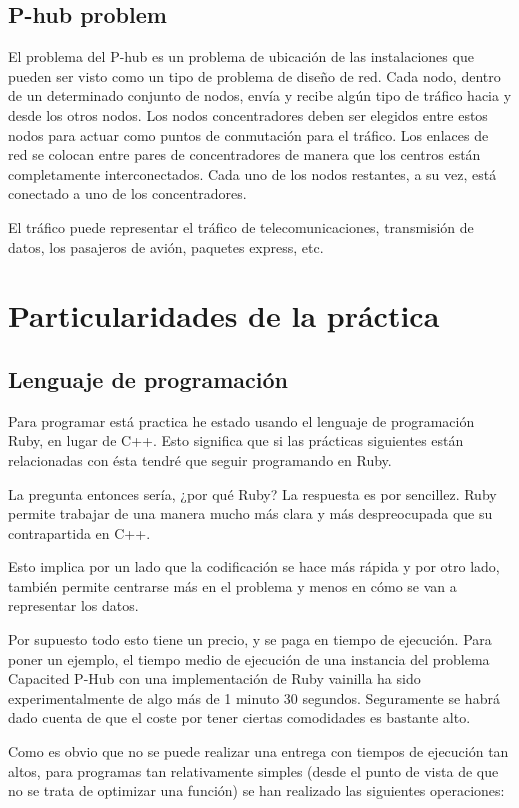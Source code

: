 \documentclass[12pt,a4paper,draft,openany]{article}
\begin{document}
\subsection{P-hub problem}
El problema del P-hub es un problema de ubicación de las instalaciones que pueden ser visto como un tipo de problema de diseño de red. Cada nodo, dentro de un determinado conjunto de nodos, envía y recibe algún tipo de tráfico hacia y desde los otros nodos. Los nodos concentradores deben ser elegidos entre estos nodos para actuar como puntos de conmutación para el tráfico. Los enlaces de red se colocan entre pares de concentradores de manera que los centros están completamente interconectados. Cada uno de los nodos restantes, a su vez, está conectado a uno de los concentradores. 

El tráfico puede representar el tráfico de telecomunicaciones, transmisión de datos, los pasajeros de avión, paquetes express, etc.

\section{Particularidades de la práctica}
\subsection{Lenguaje de programación}
Para programar está practica he estado usando el lenguaje de programación Ruby, en lugar de C++. Esto significa que si las prácticas siguientes están relacionadas con ésta tendré que seguir programando en Ruby.

La pregunta entonces sería, ¿por qué Ruby? La respuesta es por sencillez. Ruby permite trabajar de una manera mucho más clara y más despreocupada que su contrapartida en C++. 

Esto implica por un lado que la codificación se hace más rápida y por otro lado, también permite centrarse más en el problema y menos en cómo se van a representar los datos.

Por supuesto todo esto tiene un precio, y se paga en tiempo de ejecución. Para poner un ejemplo, el tiempo medio de ejecución de una instancia del problema Capacited P-Hub con una implementación de Ruby vainilla ha sido experimentalmente de algo más de 1 minuto 30 segundos.  
Seguramente se habrá dado cuenta de que el coste por tener ciertas comodidades es bastante alto.

Como es obvio que no se puede realizar una entrega con tiempos de ejecución tan altos, para programas tan relativamente simples (desde el punto de vista de que no se trata de optimizar una función) se han realizado las siguientes operaciones:
\end{document}
